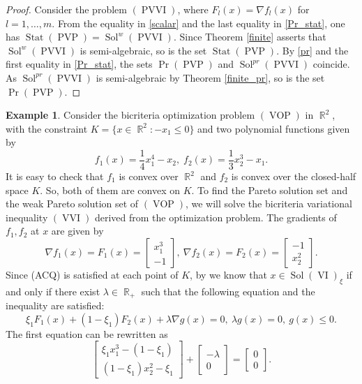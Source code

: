 \documentclass[]{interact}
\theoremstyle{plain}%
\theoremstyle{definition}
\newtheorem{example}{Example}[section]
\DeclareMathOperator{\Sol}{Sol}
\DeclareMathOperator{\PVVI}{PVVI}
\DeclareMathOperator{\PVP}{PVP}
\DeclareMathOperator{\VOP}{VOP}
\DeclareMathOperator{\VI}{VI}
\DeclareMathOperator{\Stat}{Stat}
\DeclareMathOperator{\R}{\mathbb{R}}
\DeclareMathOperator{\VVI}{VVI}
\begin{document}
\begin{proof} Consider the problem $(\PVVI)$, where $F_l(x)=\nabla f_l(x)$ for $l=1,\dots,m$. 	
	From the equality in \eqref{scalar} and the last equality in \eqref{Pr_stat}, one has  $\Stat(\PVP)=\Sol^w(\PVVI)$. Since Theorem \ref{finite} asserts that $\Sol^w(\PVVI)$ is  semi-algebraic, so is the set $\Stat(\PVP)$.
By \eqref{pr} and the first equality in \eqref{Pr_stat}, the sets $\Pr(\PVP)$ and $\Sol^{pr}(\PVVI)$ coincide. As $\Sol^{pr}(\PVVI)$ is semi-algebraic by Theorem \ref{finite_pr}, so is the set $\Pr(\PVP)$.
\end{proof}
\begin{example}
	Consider the bicriteria optimization problem $(\VOP)$ in $\R^2$, with the constraint $K=\{x\in\R^2:-x_1\leq 0\}$ and two polynomial functions given by $$f_1(x)=\frac{1}{4}x_1^4-x_2,\; f_2(x)=\frac{1}{3}x_2^3-x_1.$$
 It is easy to check that $f_1$ is convex over $\R^2$ and $f_2$ is convex over the closed-half space $K$. So, both of them are convex on $K$. To find the Pareto solution set and the weak Pareto solution set of $(\VOP)$, we will solve the bicriteria variational inequality $(\VVI)$ derived from the optimization problem. 
	The gradients of $f_1,f_2$ at $x$ are given by
	$$\nabla f_1(x)=F_1(x)=\begin{bmatrix}
	x_1^3\\ 
	-1
	\end{bmatrix},\ \nabla f_2(x)= F_2(x)=\begin{bmatrix}
	-1\\ 
	x_2^2
	\end{bmatrix}.$$ 
	Since {\rm(ACQ)} is satisfied at each point of $K$, by \cite[Proposition 1.3.4]{FaPa03}  we know that 
	$x\in\Sol(\VI)_{\xi}$ if and only if there exist $\lambda\in \R_+$ such that the following equation and the inequality are satisfied:
	$$\xi_1F_1(x)+(1-\xi_1)F_2(x)+\lambda\nabla g(x)=0,\ \lambda g(x)=0,\ g(x) \leq 0.$$
	The first equation can be rewritten as
	\begin{equation}\label{equation_matrix_2}
	\begin{bmatrix}
	\xi_1 x_1^3-(1-\xi_1)\\ 
	(1-\xi_1)x_2^2-\xi_1
	\end{bmatrix}+\begin{bmatrix}
	-\lambda\\ 
	0
	\end{bmatrix}=\begin{bmatrix}
	0\\ 
	0
	\end{bmatrix}.

\end{equation}
\end{example}
\end{document}
